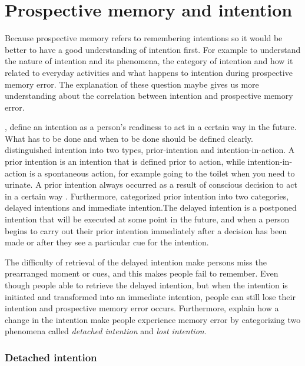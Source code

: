 \section{Prospective memory and intention}
Because prospective memory refers to remembering intentions so it would be better to have a good understanding of intention first. For example to understand the nature of intention and its
phenomena, the category of intention and how it related to everyday activities and what happens to intention during prospective memory error. The explanation of these question maybe gives us more understanding about the correlation between intention and prospective memory error.

\cite{LiaKvavilashviliAndJudiEllis}, \cite{gauld1977human} define an intention as a person's readiness to act in a certain way in the future. What has to be done and when to be done should be defined clearly.
\cite{searle1983intentionality} distinguished intention into two types, prior-intention and intention-in-action. A prior intention is an intention that is defined prior to action, while intention-in-action is a spontaneous action, for example going to the toilet when you need to urinate. A prior intention always occurred as a result of conscious decision to act in a certain way \citep{Heckhausen1985-HECFWT}. Furthermore, \cite{gauld1977human} categorized prior intention into two categories, delayed intentions and immediate intention.The delayed intention is a postponed intention that will be executed at some point in the future, and when a person begins to carry out their prior intention immediately after a decision has been made or after they see a particular cue for the intention.


The difficulty of retrieval of the delayed intention make persons miss the prearranged moment or cues, and this makes people fail to remember. Even though people able to retrieve the delayed intention, but when the intention is initiated and transformed into an immediate intention,  people can still lose their intention and prospective memory error occurs.
Furthermore, \cite{Reason1984} explain how a change in the intention make people experience memory error by categorizing two phenomena called \textit{detached intention} and \textit{lost intention}.

\subsubsection{Detached intention}


